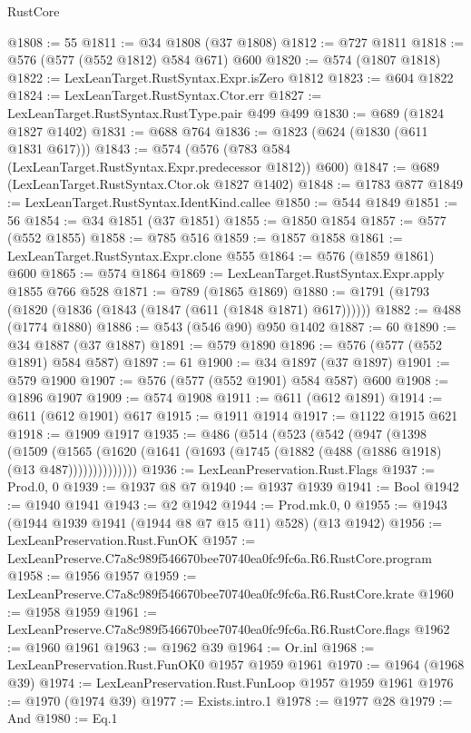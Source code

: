 \begin{lexlean}{RustCore}
\begin{coremodule}
@1808 := 55
@1811 := @34 @1808 (@37 @1808)
@1812 := @727 @1811
@1818 := @576 (@577 (@552 @1812) @584 @671) @600
@1820 := @574 (@1807 @1818)
@1822 := LexLeanTarget.RustSyntax.Expr.isZero @1812
@1823 := @604 @1822
@1824 := LexLeanTarget.RustSyntax.Ctor.err
@1827 := LexLeanTarget.RustSyntax.RustType.pair @499 @499
@1830 := @689 (@1824 @1827 @1402)
@1831 := @688 @764
@1836 := @1823 (@624 (@1830 (@611 @1831 @617)))
@1843 := @574 (@576 (@783 @584 (LexLeanTarget.RustSyntax.Expr.predecessor @1812)) @600)
@1847 := @689 (LexLeanTarget.RustSyntax.Ctor.ok @1827 @1402)
@1848 := @1783 @877
@1849 := LexLeanTarget.RustSyntax.IdentKind.callee
@1850 := @544 @1849
@1851 := 56
@1854 := @34 @1851 (@37 @1851)
@1855 := @1850 @1854
@1857 := @577 (@552 @1855)
@1858 := @785 @516
@1859 := @1857 @1858
@1861 := LexLeanTarget.RustSyntax.Expr.clone @555
@1864 := @576 (@1859 @1861) @600
@1865 := @574 @1864
@1869 := LexLeanTarget.RustSyntax.Expr.apply @1855 @766 @528
@1871 := @789 (@1865 @1869)
@1880 := @1791 (@1793 (@1820 (@1836 (@1843 (@1847 (@611 (@1848 @1871) @617))))))
@1882 := @488 (@1774 @1880)
@1886 := @543 (@546 @90) @950 @1402
@1887 := 60
@1890 := @34 @1887 (@37 @1887)
@1891 := @579 @1890
@1896 := @576 (@577 (@552 @1891) @584 @587)
@1897 := 61
@1900 := @34 @1897 (@37 @1897)
@1901 := @579 @1900
@1907 := @576 (@577 (@552 @1901) @584 @587) @600
@1908 := @1896 @1907
@1909 := @574 @1908
@1911 := @611 (@612 @1891)
@1914 := @611 (@612 @1901) @617
@1915 := @1911 @1914
@1917 := @1122 @1915 @621
@1918 := @1909 @1917
@1935 := @486
    (@514
      (@523
        (@542
          (@947
            (@1398
              (@1509
                (@1565
                  (@1620 (@1641 (@1693 (@1745 (@1882 (@488 (@1886 @1918) (@13 @487))))))))))))))
@1936 := LexLeanPreservation.Rust.Flags
@1937 := Prod.{0, 0}
@1939 := @1937 @8 @7
@1940 := @1937 @1939
@1941 := Bool
@1942 := @1940 @1941
@1943 := @2 @1942
@1944 := Prod.mk.{0, 0}
@1955 := @1943 (@1944 @1939 @1941 (@1944 @8 @7 @15 @11) @528) (@13 @1942)
@1956 := LexLeanPreservation.Rust.FunOK
@1957 := LexLeanPreserve.C7a8c989f546670bee70740ea0fc9fc6a.R6.RustCore.program
@1958 := @1956 @1957
@1959 := LexLeanPreserve.C7a8c989f546670bee70740ea0fc9fc6a.R6.RustCore.krate
@1960 := @1958 @1959
@1961 := LexLeanPreserve.C7a8c989f546670bee70740ea0fc9fc6a.R6.RustCore.flags
@1962 := @1960 @1961
@1963 := @1962 @39
@1964 := Or.inl
@1968 := LexLeanPreservation.Rust.FunOK0 @1957 @1959 @1961
@1970 := @1964 (@1968 @39)
@1974 := LexLeanPreservation.Rust.FunLoop @1957 @1959 @1961
@1976 := @1970 (@1974 @39)
@1977 := Exists.intro.{1}
@1978 := @1977 @28
@1979 := And
@1980 := Eq.{1}

\end{coremodule}
\end{lexlean}

